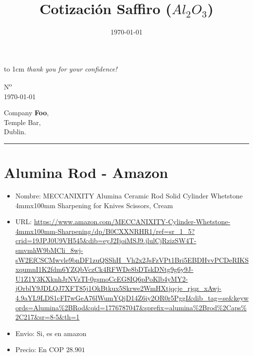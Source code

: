 \documentclass[a4paper]{article}
\title{Cotización Saffiro ($Al_2O_3$)}
\date{\today}
\makeatletter
\let\displayFont\relax
\let\thetitle\@title
\makeatother
\begin{document}
\parbox[b][2cm][t]{\rightalignment}{{\color{gray!95}\displayFont\fontsize{1.5cm}{1.5cm}\selectfont %
\vbox to 1cm{\vss %
%
\companyname{}%
%
}}
\vskip 3mm%
{\fontsize{0.44cm}{0.5cm}%
\emph{thank you for your confidence!}%
}
}%
%
\parbox[b][2cm][t]{0.35\textwidth}{}

\kern -5mm

\leavevmode\kern \rightalignment \parbox{0.35\textwidth}{\ttfamily N\textsuperscript{o} \invoicenum\\
\today }

\vskip 0.7cm

\leavevmode\kern \rightalignment\kern -3mm \colorbox{gray!85}{
  \kern 1mm\begin{minipage}[t]{0.5\textwidth}
    \color{white}
    \vskip 2mm
    Company \textbf{Foo},\\
    Temple Bar,\\
    Dublin.\\
    \vspace*{-3mm}%
  \end{minipage}
}

\vskip 2.3cm

\begin{center}
{\ttfamily\LARGE \thetitle}

\rule{2cm}{0.25pt}
\end{center}

\section{Alumina Rod - Amazon}
\begin{itemize}
  \item Nombre: MECCANIXITY Alumina Ceramic Rod Solid Cylinder Whetstone 4mmx100mm Sharpening for Knives Scissors, Cream 
  \item URL: \url{https://www.amazon.com/MECCANIXITY-Cylinder-Whetstone-4mmx100mm-Sharpening/dp/B0CXXNRHR1/ref=sr_1_5?crid=19JPJ0U9VH545&dib=eyJ2IjoiMSJ9.jlulCjRzizSW4T-smvmhW9bMCli_8wj-sW2EfCSCMwvle9bnDF1zuQSShH_Vh2x2JsFzVPt1Bri5EBDHvvPCDeRIKSxqumnI1K2fdm6YZQbVczCk4RFWDe8bDTskDNtg9g6y9J-U1Z1Y3KXknhJrNVzTI-0gsmoCcEG8IQ6pPoKlb4yMY2-jOrblY9JDLQJ7XFT85j1OkBtkux5Skrwe2WmHXtjqcje_rjqz_xAwj-4.9aYL9LDS1cFI7wGeA76lWumYQjD14Z6iy2OR0r5PggI&dib_tag=se&keywords=Alumina\%2BRod&qid=1776787047&sprefix=alumina\%2Brod\%2Caps\%2C217&sr=8-5&th=1}
  \item Envio: Si, es en amazon
  \item Precio: En COP $28.901$
\end{itemize}
\end{document}
